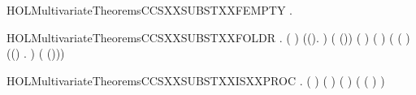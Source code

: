 \newcommand{\HOLMultivariateTheoremsCCSXXSUBSTXXelimYY}{\UseVerbatim{HOLMultivariateTheoremsCCSXXSUBSTXXelimYY}}
\begin{SaveVerbatim}{HOLMultivariateTheoremsCCSXXSUBSTXXFEMPTY}
\HOLTokenTurnstile{} \HOLSymConst{\HOLTokenForall{}}.    \HOLSymConst{=} 
\end{SaveVerbatim}
\newcommand{\HOLMultivariateTheoremsCCSXXSUBSTXXFEMPTY}{\UseVerbatim{HOLMultivariateTheoremsCCSXXSUBSTXXFEMPTY}}
\begin{SaveVerbatim}{HOLMultivariateTheoremsCCSXXSUBSTXXFOLDR}
\HOLTokenTurnstile{} \HOLSymConst{\HOLTokenForall{}}  .
         \HOLSymConst{\HOLTokenConj{}} (  \HOLSymConst{=}  ) \HOLSymConst{\HOLTokenConj{}}
        (\HOLTokenLambda{}(\HOLSymConst{,}).   \HOLConst{\HOLTokenSubset{}} \HOLTokenLeftbrace{}\HOLTokenRightbrace{}) ( (\HOLSymConst{,})) \HOLSymConst{\HOLTokenConj{}}
        ( ) ( ) \HOLSymConst{\HOLTokenImp{}}
       ( ( \HOLSymConst{\HOLTokenMapto{}} )  \HOLSymConst{=}
         (\HOLTokenLambda{}(\HOLSymConst{,}) .    )  ( (\HOLSymConst{,})))
\end{SaveVerbatim}
\newcommand{\HOLMultivariateTheoremsCCSXXSUBSTXXFOLDR}{\UseVerbatim{HOLMultivariateTheoremsCCSXXSUBSTXXFOLDR}}
\begin{SaveVerbatim}{HOLMultivariateTheoremsCCSXXSUBSTXXISXXPROC}
\HOLTokenTurnstile{} \HOLSymConst{\HOLTokenForall{}}  .
         \HOLSymConst{\HOLTokenConj{}} (  \HOLSymConst{=}  ) \HOLSymConst{\HOLTokenConj{}}   \HOLSymConst{\HOLTokenConj{}}
         \HOLConst{\HOLTokenSubset{}}   \HOLSymConst{\HOLTokenConj{}}  ( ) ( ) \HOLSymConst{\HOLTokenImp{}}
        ( ( \HOLSymConst{\HOLTokenMapto{}} ) )
\end{SaveVerbatim}
